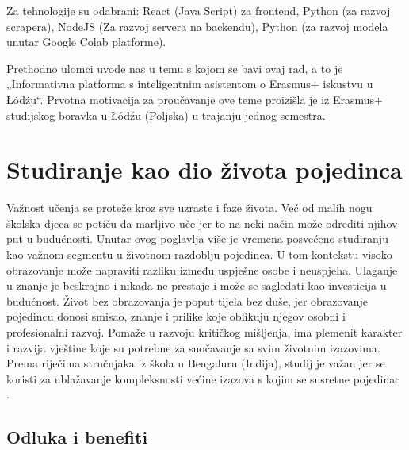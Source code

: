 \documentclass[]{foi}
\begin{document}
Za tehnologije su odabrani: React (Java Script) za frontend, Python (za razvoj scrapera), NodeJS (Za razvoj servera na backendu), 
Python (za razvoj modela unutar Google Colab platforme). 

Prethodno ulomci uvode nas u temu s kojom se bavi ovaj rad, a to je „Informativna platforma s inteligentnim asistentom o Erasmus+ 
iskustvu u Łódźu“. Prvotna motivacija za proučavanje ove teme proizišla je iz Erasmus+ studijskog boravka u Łódźu (Poljska) u trajanju jednog semestra.



\chapter{Studiranje kao dio života pojedinca}

Važnost učenja se proteže kroz sve uzraste i faze života. Već od malih nogu školska djeca se potiču da marljivo uče jer to na neki način može odrediti njihov put u budućnosti.
Unutar ovog poglavlja više je vremena posvećeno studiranju kao važnom segmentu u životnom razdoblju pojedinca. U tom kontekstu visoko obrazovanje može napraviti razliku između uspješne osobe
i neuspjeha. Ulaganje u znanje je beskrajno i nikada ne prestaje i može se sagledati kao investicija u budućnost. Život bez obrazovanja je poput tijela bez duše, jer obrazovanje pojedincu donosi smisao, 
znanje i prilike koje oblikuju njegov osobni i profesionalni razvoj. Pomaže u razvoju kritičkog mišljenja, ima plemenit karakter i razvija vještine koje su potrebne za suočavanje sa svim životnim izazovima. 
Prema riječima stručnjaka iz škola u Bengaluru (Indija), studij je važan jer se koristi za ublažavanje kompleksnosti većine izazova s kojim se susretne pojedinac \cite{digital3602025studies}. 



\section{Odluka i benefiti}
\end{document}
